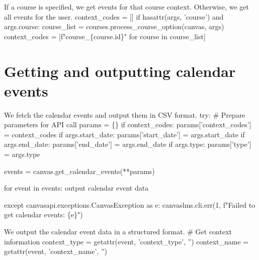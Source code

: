 If a course is specified, we get events for that course context.
Otherwise, we get all events for the user.
\nwenddocs{}\endmoddef\nwstartdeflinemarkup{}\nwenddeflinemarkup
context_codes = []
if hasattr(args, 'course') and args.course:
  course_list = courses.process_course_option(canvas, args)
  context_codes = [f"course_\{course.id\}" for course in course_list]
\nwendcode{}\nwdocspar


\section{Getting and outputting calendar events}

We fetch the calendar events and output them in CSV format.
\nwenddocs{}\endmoddef\nwstartdeflinemarkup{}\nwenddeflinemarkup
try:
  # Prepare parameters for API call
  params = \{\}
  if context_codes:
    params['context_codes'] = context_codes
  if args.start_date:
    params['start_date'] = args.start_date
  if args.end_date:
    params['end_date'] = args.end_date
  if args.type:
    params['type'] = args.type
    
  events = canvas.get_calendar_events(**params)
  
  for event in events:
    \LA{}output calendar event data~{\nwtagstyle{}}\RA{}
    
except canvasapi.exceptions.CanvasException as e:
  canvaslms.cli.err(1, f"Failed to get calendar events: \{e\}")
\nwendcode{}\nwdocspar

We output the calendar event data in a structured format.
\nwenddocs{}\endmoddef\nwstartdeflinemarkup{}\nwenddeflinemarkup
# Get context information
context_type = getattr(event, 'context_type', '')
context_name = getattr(event, 'context_name', '')

